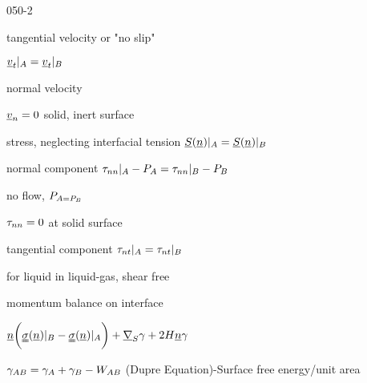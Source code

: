 \begin{mitframe}{050-2}
\begin{listtwo}
	\item tangential velocity or "no slip"
    	\begin{listthree}
        	\item $\uline{\vvel}_t|_{\helmholtz}=\uline{\vvel}_t|_{\exergy}$
            \end{listthree}
	\item normal velocity
    		\begin{listthree}
            	\item $\uline{\vvel}_n=0$ solid, inert surface
            \end{listthree}
    \item stress, neglecting interfacial tension $\stressvec(\normvec)|_{\helmholtz}=\stressvec(\normvec)|_{\exergy}$
    		\begin{listthree}
            	\item normal component $\torque_{nn}|_{\helmholtz}-\p_{\helmholtz}=\torque_{nn}|_{\exergy}-\p_{\exergy}$
                    \begin{listfour}
                    	\item no flow, $\p_{\helmholtz=\p_{\exergy}}$
                        \item $\torque_{nn}=0$ at solid surface
                    \end{listfour}
            	\item tangential component $\torque_{nt}|_{\helmholtz}=\torque_{nt}|_{\exergy}$
                    \begin{listfour}
                    	\item for liquid in liquid-gas, shear free
                    \end{listfour}
            \end{listthree}
    \item momentum balance on interface
    		\begin{listthree}
            	\item $\uline{n}\bigg(\stresstens(\uline{n})|_{\exergy}-\stresstens(\uline{n})|_{\helmholtz}\bigg)+\gradop_{\entropy}\gamma+2\enthalpy\uline{n}\gamma$
           			\item $\gamma_{\helmholtz\exergy}=\gamma_{\helmholtz}+\gamma_{\exergy}-\work_{\helmholtz\exergy}$ (Dupre Equation)-Surface free energy/unit area

\end{listthree}
\end{listtwo}
\end{mitframe}
